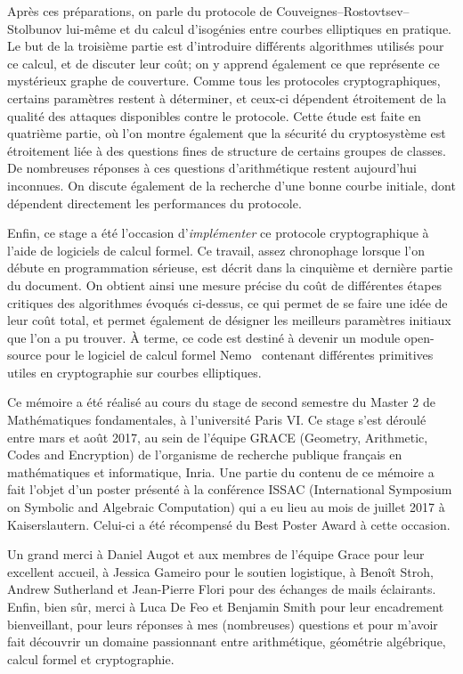 \documentclass[11pt,a4paper]{article}
\renewcommand{\v}{\vspace{5mm}}
\theoremstyle{definition}
\begin{document}
Après ces préparations, on parle du protocole de Couveignes--Rostovtsev--Stolbunov lui-même et du calcul d'isogénies entre courbes elliptiques \og en pratique\fg. Le but de la troisième partie est d'introduire différents algorithmes utilisés pour ce calcul, et de discuter leur coût; on y apprend également ce que représente ce mystérieux graphe de couverture. Comme tous les protocoles cryptographiques, certains paramètres restent à déterminer, et ceux-ci dépendent
étroitement de la qualité des attaques disponibles contre le protocole. Cette étude est faite en quatrième partie, où l'on montre également que la sécurité du cryptosystème est étroitement liée à des questions fines de structure de certains groupes de classes. De nombreuses réponses à ces questions d'arithmétique restent aujourd'hui inconnues. On discute également de la recherche d'une bonne courbe initiale, dont dépendent directement les performances du protocole.

Enfin, ce stage a été l'occasion d'\emph{implémenter} ce protocole cryptographique à l'aide de logiciels de calcul formel. Ce travail, assez chronophage lorsque l'on débute en programmation sérieuse, est décrit dans la cinquième et dernière partie du document. On obtient ainsi une mesure précise du coût de différentes étapes critiques des algorithmes évoqués ci-dessus, ce qui permet de se faire une idée de leur coût total, et permet également de désigner les meilleurs paramètres initiaux que l'on a pu trouver. À terme, ce code est destiné à devenir un module open-source pour le logiciel de calcul formel Nemo~\cite{...} contenant différentes primitives utiles en cryptographie sur courbes elliptiques.



\v

Ce mémoire a été réalisé au cours du stage de second semestre du Master 2 de Mathématiques fondamentales, à l'université Paris VI. Ce stage s'est déroulé entre mars et août 2017, au sein de l'équipe GRACE (Geometry, Arithmetic, Codes and Encryption) de l'organisme de recherche publique français en mathématiques et informatique, Inria. Une partie du contenu de ce mémoire a fait l'objet d'un poster présenté à la conférence ISSAC (International Symposium on Symbolic and Algebraic Computation) qui a eu lieu au mois de juillet 2017 à Kaiserslautern. Celui-ci a été récompensé du Best Poster Award à cette occasion.

Un grand merci à Daniel Augot et aux membres de l'équipe Grace pour leur excellent accueil, à Jessica Gameiro pour le soutien logistique, à Benoît Stroh, Andrew Sutherland et Jean-Pierre Flori pour des échanges de mails éclairants. Enfin, bien sûr, merci à Luca De Feo et Benjamin Smith pour leur encadrement bienveillant, pour leurs réponses à mes (nombreuses) questions et pour m'avoir fait découvrir un domaine passionnant entre arithmétique, géométrie algébrique, calcul formel et cryptographie.
\end{document}
